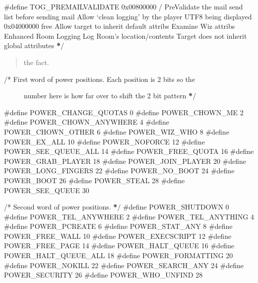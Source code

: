 \documentclass[letterpaper,10pt,english]{sphinxmanual}
\begin{document}
{\#define TOG\_PREMAILVALIDATE     0x00800000      /} Pre\sphinxhyphen{}Validate the mail send list before sending mail  Allow ‘clean logging’ by the player  UTF8 being displayed \sphinxstyleemphasis{/
/} 0x04000000 free  Allow target to inherit default attribs  Examine Wiz attribs  Enhanced Room Logging  Log Room’s location/contents  Target does not inherit global attributes {\color{red}\bfseries{}*}/
\begin{quote}

\sphinxAtStartPar
the fact.
\end{quote}
\begin{description}
\item[{/* First word of power positions.  Each position is 2 bits so the}] \leavevmode
\sphinxAtStartPar
number here is how far over to shift the 2 bit pattern         {\color{red}\bfseries{}*}/

\end{description}

\sphinxAtStartPar
\#define POWER\_CHANGE\_QUOTAS     0
\#define POWER\_CHOWN\_ME          2
\#define POWER\_CHOWN\_ANYWHERE    4
\#define POWER\_CHOWN\_OTHER       6
\#define POWER\_WIZ\_WHO           8
\#define POWER\_EX\_ALL            10
\#define POWER\_NOFORCE           12
\#define POWER\_SEE\_QUEUE\_ALL     14
\#define POWER\_FREE\_QUOTA        16
\#define POWER\_GRAB\_PLAYER       18
\#define POWER\_JOIN\_PLAYER       20
\#define POWER\_LONG\_FINGERS      22
\#define POWER\_NO\_BOOT           24
\#define POWER\_BOOT              26
\#define POWER\_STEAL             28
\#define POWER\_SEE\_QUEUE         30

\sphinxAtStartPar
/* Second word of power positions. {\color{red}\bfseries{}*}/
\#define POWER\_SHUTDOWN          0
\#define POWER\_TEL\_ANYWHERE      2
\#define POWER\_TEL\_ANYTHING      4
\#define POWER\_PCREATE           6
\#define POWER\_STAT\_ANY          8
\#define POWER\_FREE\_WALL         10
\#define POWER\_EXECSCRIPT        12
\#define POWER\_FREE\_PAGE         14
\#define POWER\_HALT\_QUEUE        16
\#define POWER\_HALT\_QUEUE\_ALL    18
\#define POWER\_FORMATTING        20
\#define POWER\_NOKILL            22
\#define POWER\_SEARCH\_ANY        24
\#define POWER\_SECURITY          26
\#define POWER\_WHO\_UNFIND        28
\end{document}
